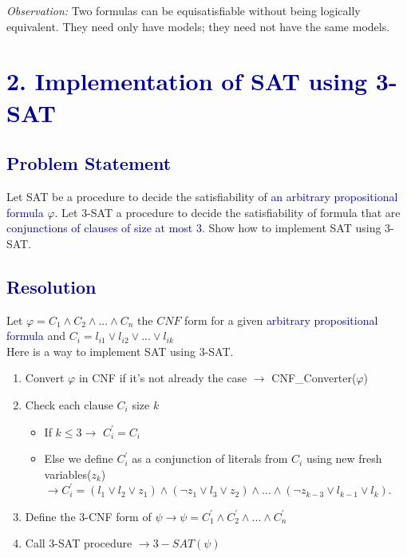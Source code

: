 \documentclass[12pt]{article}
\theoremstyle{definition}
\theoremstyle{plain}
\begin{document}
\vspace{0.5cm}
\noindent
\textit{Observation:} Two formulas can be equisatisfiable without being logically equivalent. They need only have models; they need not have the same models.

\section*{\textcolor{darkblue}{2. Implementation of SAT using 3-SAT}}
\subsection*{\textcolor{darkblue}{Problem Statement}}
\vspace{0.5cm}
\begin{tcolorbox}[colback=lightgray, colframe=darkblue, boxrule=1pt]
Let SAT be a procedure to decide the satisfiability of \textcolor{darkblue}{an arbitrary propositional formula} $\varphi$. Let 3-SAT a procedure to decide the satisfiability of formula that are \textcolor{darkblue}{conjunctions of clauses of size at most 3}. Show how to implement SAT using 3-SAT.
\end{tcolorbox}
\vspace{0.3cm}
\noindent

\subsection*{\textcolor{darkblue}{Resolution}}
Let $\varphi = C_1 \wedge C_2 \wedge... \wedge C_n$ the $\mathit{CNF}$ form for a given \textcolor{darkblue}{arbitrary propositional formula} and $C_i = l_{i1} \vee l_{i2} \vee ... \vee l_{ik}$\\

Here is a way to implement SAT using 3-SAT.
\vspace{0.5cm}
\begin{tcolorbox}[colback=lightgray, colframe=darkblue, boxrule=1pt]
\begin{enumerate}
  \item Convert $\varphi$ in CNF if it's not already the case $\rightarrow$ CNF\_Converter($\varphi$)
  \item Check each clause $C_i$ size $k$
    \begin{itemize}
      \item If $k \leq 3 \rightarrow$ $C^{'}_i = C_i$ 
      \item Else we define $C^{'}_i$ as a conjunction of literals from $C_i$ using new fresh variables($z_k$) $\rightarrow C^{'}_i =  (l_1 \vee l_2 \vee z_1)\wedge(\neg z_1 \vee l_3 \vee z_2)\wedge...\wedge(\neg z_{k-3} \vee l_{k-1}\vee l_{k})$.\cite{srba2025lecture13}
    \end{itemize}
    \item Define the 3-CNF form of $\psi \rightarrow \psi = C^{'}_1 \wedge C^{'}_2\wedge...\wedge C^{'}_n$
\item Call 3-SAT procedure $\rightarrow 3-SAT(\psi)$
\end{enumerate}
\end{tcolorbox}
\vspace{0.3cm}
\noindent
\end{document}
